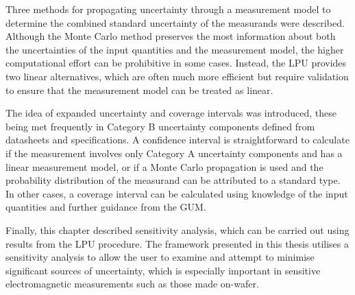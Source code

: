 \documentclass[../thesis/thesis.tex]{subfiles}
\begin{document}
\begin{refsection}
Three methods for propagating uncertainty through a measurement model to determine the combined standard uncertainty of the measurands were described. Although the Monte Carlo method preserves the most information about both the uncertainties of the input quantities and the measurement model, the higher computational effort can be prohibitive in some cases. Instead, the LPU provides two linear alternatives, which are often much more efficient but require validation to ensure that the measurement model can be treated as linear.

The idea of expanded uncertainty and coverage intervals was introduced, these being met frequently in Category B uncertainty components defined from datasheets and specifications. A confidence interval is straightforward to calculate if the measurement involves only Category A uncertainty components and has a linear measurement model, or if a Monte Carlo propagation is used and the probability distribution of the measurand can be attributed to a standard type. In other cases, a coverage interval can be calculated using knowledge of the input quantities and further guidance from the GUM.

Finally, this chapter described sensitivity analysis, which can be carried out using results from the LPU procedure. The framework presented in this thesis utilises a sensitivity analysis to allow the user to examine and attempt to minimise significant sources of uncertainty, which is especially important in sensitive electromagnetic measurements such as those made on-wafer.

\printbibliography[title=References]
\end{refsection}
\end{document}
